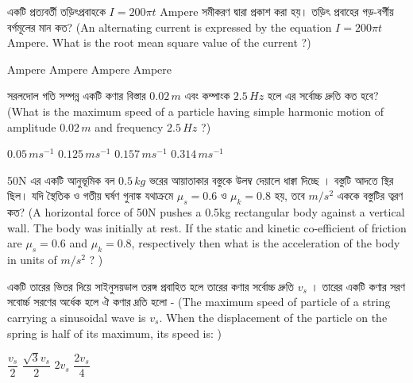 \documentclass[addpoints]{exam}
\begin{document}
\begin{questions}
\begin{oneparchoices}
\end{oneparchoices}

\question  একটি প্রত্যবর্তী তড়িৎপ্রবাহকে $ I=200\pi t $ Ampere সমীকরণ দ্বারা প্রকাশ করা হয়। তড়িৎ প্রবাহের গড়-বর্গীয় বর্গমূলের মান কত? (An alternating current is expressed by the equation $ I=200\pi t $ Ampere. What is the root mean square value of the current ?)

\begin{oneparchoices}
 Ampere
 Ampere
 Ampere
 Ampere
\end{oneparchoices}


\question  সরলদোল গতি সম্পন্ন একটি কণার বিস্তার $ 0.02\,m $ এবং কম্পাংক $ 2.5\,Hz $ হলে এর সর্বোচ্চ দ্রুতি কত হবে? (What is the maximum speed of a particle having simple harmonic motion of amplitude $ 0.02\,m $ and frequency $ 2.5\,Hz $ ?)

\begin{oneparchoices}
\choice $ 0.05\,ms^{-1} $
\choice $ 0.125\,ms^{-1} $
\choice $ 0.157\,ms^{-1} $
\choice $ 0.314\,ms^{-1} $
\end{oneparchoices}

\question 50N এর একটি আনুভূমিক বল $ 0.5\,kg $ ভরের আয়াতাকার বস্তুকে উলম্ব দেয়ালে ধাক্বা দিচ্ছে । বস্তুটি আদতে স্থির ছিল। যদি স্থৈতিক ও গতীয় ঘর্ষণ গুনাঙ্ক যথাক্রমে $ \mu_{s} = 0.6 $ ও  $ \mu_{k} = 0.8 $ হয়, তবে $ m/s^{2} $ এককে বস্তুটির ত্বরণ কত? (A horizontal force of 50N pushes a 0.5kg rectangular body against a vertical wall. The body was initially at rest. If the static and kinetic co-efficient of friction are $ \mu_{s} = 0.6 $ and $ \mu_{k} = 0.8 $, respectively then what is the acceleration of the body in units of $ m/s^{2} $ ? )

\begin{oneparchoices}
\end{oneparchoices}

\question  একটি তারের ভিতর দিয়ে সাইনুসয়ডাল তরঙ্গ প্রবাহিত হলে তারের কণার সর্বোচ্চ দ্রুতি $ v_{s} $ । তারের একটি কণার সরণ সবোর্চ্চ সরণের অর্ধেক হলে ঐ কণার দ্রতি হলো - (The maximum speed of particle of a string carrying a sinusoidal wave is $ v_{s} $. When the displacement of the particle on the spring is half of its maximum, its speed is: )

\begin{oneparchoices}
\choice $ \dfrac{v_{s}}{2} $
\choice $ \dfrac{\sqrt{3}v_{s}}{2} $
\choice $ 2v_{s} $
\choice $ \dfrac{2v_{s}}{4} $
\end{oneparchoices}


\end{questions}
\end{document}
